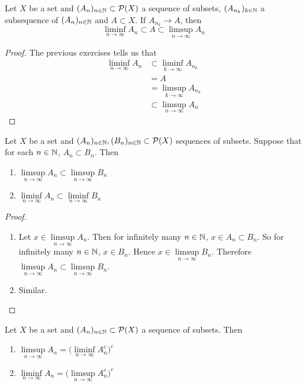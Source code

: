 \documentclass{book}
\begin{document}
	\begin{ex}  
		Let $X$ be a set and $(A_n)_{n \in \mathbb{N}} \subset \mathcal{P}(X)$ a sequence of subsets, $(A_{n_k})_{k \in \mathbb{N}}$ a subsequence of $(A_n)_{n \in \mathbb{N}}$ and $A \subset X$. If $A_{n_k} \rightarrow A$, then $$\liminf\limits_{n \rightarrow \infty}A_n \subset A \subset \limsup\limits_{n \rightarrow \infty}A_n$$
	\end{ex}
	
	\begin{proof}
		The previous exercises tells us that 
		\begin{align*}
			\liminf\limits_{n \rightarrow \infty}A_n
			& \subset \liminf\limits_{k \rightarrow \infty}A_{n_k} \\
			&= A \\
			&= \limsup\limits_{k \rightarrow \infty}A_{n_k} \\
			& \subset \limsup\limits_{n \rightarrow \infty}A_n
		\end{align*}
	\end{proof}
	
	\begin{ex}  
		Let $X$ be a set and $(A_n)_{n \in \mathbb{N}}, (B_n)_{n \in \mathbb{N}} \subset \mathcal{P}(X)$ sequences of subsets. Suppose that for each $n \in \mathbb{N}$, $A_n \subset B_n$. Then 
		\begin{enumerate}
			\item $\limsup\limits_{n \rightarrow \infty}A_n \subset \limsup\limits_{n \rightarrow \infty}B_n$
			\item $\liminf\limits_{n \rightarrow \infty}A_n \subset \liminf\limits_{n \rightarrow \infty}B_n$
		\end{enumerate}
	\end{ex}
	
	\begin{proof}\
		\begin{enumerate}
			\item Let $x \in \limsup\limits_{n \rightarrow \infty}A_n$. Then for infinitely many $n \in \mathbb{N}$, $x \in A_n \subset B_n$. So for infinitely many $n \in \mathbb{N}$, $x \in B_n$. Hence $x \in \limsup\limits_{n \rightarrow \infty}B_n$. Therefore $\limsup\limits_{n \rightarrow \infty}A_n \subset \limsup\limits_{n \rightarrow \infty}B_n$.
			\item Similar.
		\end{enumerate}
	\end{proof}
	
	\begin{ex}  
		Let $X$ be a set and $(A_n)_{n \in \mathbb{N}} \subset \mathcal{P}(X)$ a sequence of subsets. Then 
		\begin{enumerate}
			\item $\limsup\limits_{n \rightarrow \infty}A_n = \bigg(\liminf\limits_{n \rightarrow \infty}A_n^c \bigg)^c$
			\item $\liminf\limits_{n \rightarrow \infty}A_n = \bigg(\limsup\limits_{n \rightarrow \infty}A_n^c \bigg)^c$
		\end{enumerate}
	\end{ex}
	
\end{document}
